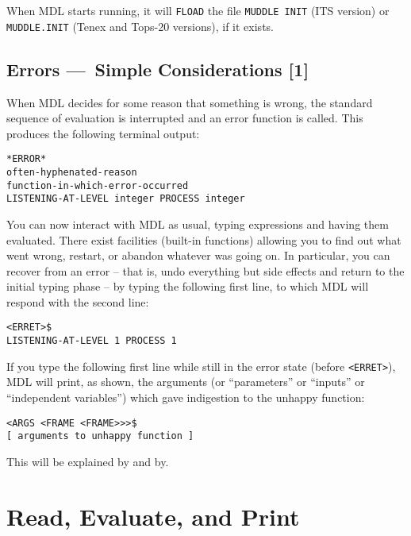\documentclass[a4paper]{scrbook}
\begin{document}
When MDL starts running, it will \texttt{FLOAD} the file \texttt{MUDDLE\ INIT} 
 (ITS  version) or \texttt{MUDDLE.INIT} (Tenex  and
Tops-20  versions), if it exists.

\section{Errors ---~Simple Considerations {[}1{]}}\label{errors-simple-considerations-1}

When MDL decides for some reason that something is wrong, the standard sequence of evaluation is interrupted and an error
function is called. This produces the following terminal output: 

\begin{verbatim}
*ERROR*
often-hyphenated-reason
function-in-which-error-occurred
LISTENING-AT-LEVEL integer PROCESS integer
\end{verbatim}

You can now interact with MDL as usual, typing expressions and having them evaluated. There exist facilities (built-in
functions) allowing you to find out what went wrong, restart, or abandon whatever was going on. In particular, you can
recover from an error -- that is, undo everything but side effects and return to the initial typing phase -- by typing the
following first line, to which MDL will respond with the second line: 

\begin{verbatim}
<ERRET>$
LISTENING-AT-LEVEL 1 PROCESS 1
\end{verbatim}

If you type the following first line while still in the error state (before \texttt{\textless{}ERRET\textgreater{}}), MDL
will print, as shown, the arguments (or ``parameters'' or ``inputs'' or ``independent variables'') which gave indigestion
to the unhappy function:

\begin{verbatim}
<ARGS <FRAME <FRAME>>>$
[ arguments to unhappy function ]
\end{verbatim}

This will be explained by and by.

\chapter{Read, Evaluate, and Print}\label{chapter-2.-read-evaluate-and-print}
\end{document}
